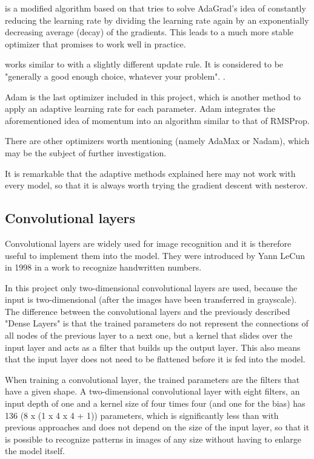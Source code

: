  \cite{Zeiler2012} is a modified algorithm based on  that tries to solve AdaGrad's idea of constantly reducing the learning rate by dividing the learning rate again by an exponentially decreasing average (decay) of the gradients.
This leads to a much more stable optimizer that promises to work well in practice.

 \cite{Hinton2012} works similar to  with a slightly different update rule.
It is considered to be "generally a good enough choice, whatever your problem". \cite [p.77]{Chollet2017}.

Adam \cite{Kingma2014}\cite{Reddi2018} is the last optimizer included in this project, which is another method to apply an adaptive learning rate for each parameter.
Adam integrates the aforementioned idea of momentum into an algorithm similar to that of RMSProp.

There are other optimizers worth mentioning (namely AdaMax or Nadam), which may be the subject of further investigation.

It is remarkable that the adaptive methods explained here may not work with every model, so that it is always worth trying the gradient descent with nesterov\cite [p.358]{Geron2019}.

\subsection{Convolutional layers}

Convolutional layers are widely used for image recognition and it is therefore useful to implement them into the model.
They were introduced by Yann LeCun in 1998 in a work \cite{Lecun1998} to recognize handwritten numbers.

In this project only two-dimensional convolutional layers are used, because the input is two-dimensional (after the images have been transferred in grayscale).
The difference between the convolutional layers and the previously described "Dense Layers" is that the trained parameters do not represent the connections of all nodes of the previous layer to a next one, but a kernel that slides over the input layer and acts as a filter that builds up the output layer.
This also means that the input layer does not need to be flattened before it is fed into the model.

When training a convolutional layer, the trained parameters are the filters that have a given shape.
A two-dimensional convolutional layer with eight filters, an input depth of one and a kernel size of four times four (and one for the bias) has 136 (8 x (1 x 4 x 4 + 1)) parameters, which is significantly less than with previous approaches and does not depend on the size of the input layer, so that it is possible to recognize patterns in images of any size without having to enlarge the model itself.


